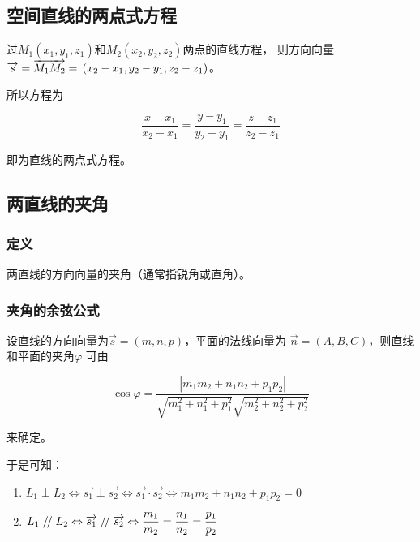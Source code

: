 \documentclass[12pt, a4paper]{article}
\numberwithin{equation}{section}
\renewcommand{\parallel}{\mathrel{/\mskip-2.5mu/}}
\begin{document}
\subsection{空间直线的两点式方程}

    过\(M_1\left(x_1, y_1, z_1\right)\)和\(M_2\left(x_2, y_2, z_2\right)\)两点的直线方程，
    则方向向量\(\overrightarrow{s} = \overrightarrow{M_{1}M_{2}} = \\
    \left(x_2-x_1, y_2-y_1, z_2-z_1\right)\)。

    所以方程为

    \begin{equation}
        \frac{x-x_1}{x_2-x_1}=\frac{y-y_1}{y_2-y_1}=\frac{z-z_1}{z_2-z_1}
    \end{equation}

    即为直线的两点式方程。

\subsection{两直线的夹角}

\subsubsection{定义}

    两直线的方向向量的夹角（通常指锐角或直角）。

\subsubsection{夹角的余弦公式}

    设直线的方向向量为\(\overrightarrow{s} = \left(m, n, p\right)\)，平面的法线向量为
    \(\overrightarrow{n} = \left(A, B, C\right)\)，则直线和平面的夹角\(\varphi\)
    可由

    \begin{equation}
        \cos \varphi=\frac{\left|m_1 m_2+n_1 n_2+p_1 p_2\right|}{\sqrt{m_1^2+n_1^2+p_1^2} \sqrt{m_2^2+n_2^2+p_2^2}}
    \end{equation}

    来确定。

    于是可知：

    \begin{enumerate}
        \item \(L_1 \perp L_2 \Leftrightarrow \overrightarrow{s_1} \perp \overrightarrow{s_2}
            \Leftrightarrow \overrightarrow{s_1} \cdot \overrightarrow{s_2} \Leftrightarrow
            m_1 m_2+n_1 n_2+p_1 p_2 = 0\)
        \item \(L_1 \parallel L_2 \Leftrightarrow \overrightarrow{s_1} \parallel \overrightarrow{s_2}
        \Leftrightarrow \dfrac{m_1}{m_2}=\dfrac{n_1}{n_2}=\dfrac{p_1}{p_2}\)
    \end{enumerate}
\end{document}
